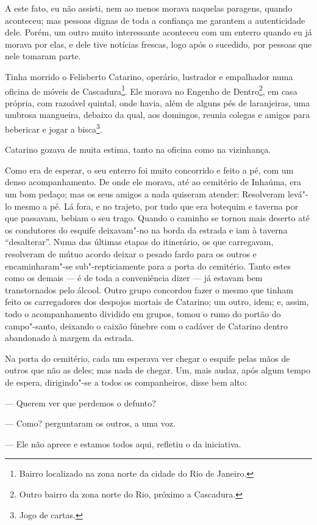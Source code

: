 A este fato, eu não assisti, nem ao menos morava naquelas paragens,
quando aconteceu; mas pessoas dignas de toda a confiança me garantem a
autenticidade dele. Porém, um outro muito interessante aconteceu com um
enterro quando eu já morava por elas, e dele tive notícias frescas, logo
após o sucedido, por pessoas que nele tomaram parte.

Tinha morrido o Felisberto Catarino, operário, lustrador e empalhador
numa oficina de móveis de Cascadura\footnote{Bairro localizado na zona
  norte da cidade do Rio de Janeiro.}. Ele morava no Engenho de
Dentro\footnote{Outro bairro da zona norte do Rio, próximo a Cascadura.},
em casa própria, com razoável quintal, onde havia, além de alguns pés de
laranjeiras, uma umbrosa mangueira, debaixo da qual, aos domingos,
reunia colegas e amigos para bebericar e jogar a bisca\footnote{Jogo de
  cartas.}.

Catarino gozava de muita estima, tanto na oficina como na vizinhança.

Como era de esperar, o seu enterro foi muito concorrido e feito a pé,
com um denso acompanhamento. De onde ele morava, até ao cemitério de
Inhaúma, era um bom pedaço; mas os seus amigos a nada quiseram atender:
Resolveram levá"-lo mesmo a pé. Lá fora, e no trajeto, por tudo que era
botequim e taverna por que passavam, bebiam o seu trago. Quando o
caminho se tornou mais deserto até os condutores do esquife deixavam"-no
na borda da estrada e iam à taverna ``desalterar''. Numa das últimas
etapas do itinerário, os que carregavam, resolveram de mútuo acordo
deixar o pesado fardo para os outros e encaminharam"-se sub"-repticiamente
para a porta do cemitério. Tanto estes como os demais --- é de toda a
conveniência dizer --- já estavam bem transtornados pelo álcool. Outro
grupo concordou fazer o mesmo que tinham feito os carregadores dos
despojos mortais de Catarino; um outro, idem; e, assim, todo o
acompanhamento dividido em grupos, tomou o rumo do portão do
campo"-santo, deixando o caixão fúnebre com o cadáver de Catarino dentro
abandonado à margem da estrada.

Na porta do cemitério, cada um esperava ver chegar o esquife pelas mãos
de outros que não as deles; mas nada de chegar. Um, mais audaz, após
algum tempo de espera, dirigindo"-se a todos os companheiros, disse bem
alto:

--- Querem ver que perdemos o defunto?

--- Como? perguntaram os outros, a uma voz.

--- Ele não aprece e estamos todos aqui, refletiu o da iniciativa.

